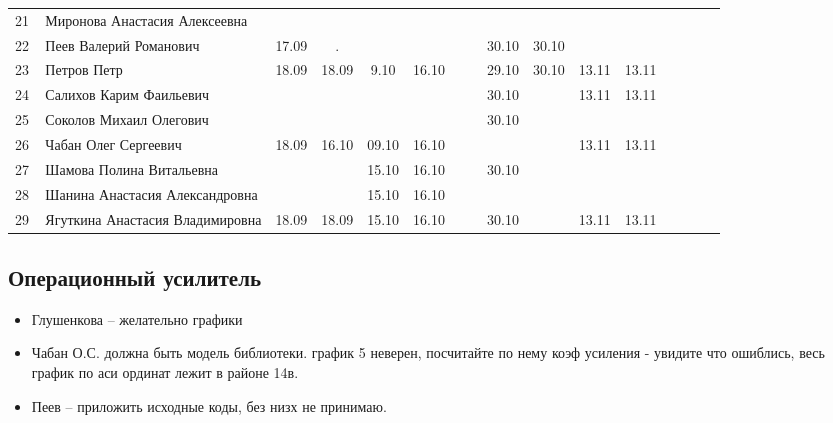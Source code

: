 \begin{tabular}{l|llccccccccccccc}
\midrule
21\,& Миронова Анастасия Алексеевна   \\
22\,& Пеев Валерий Романович          &17.09& .   &     &      &     &      &30.10&30.10\\
23\,& Петров Петр                     &18.09&18.09& 9.10&16.10 &     &      &29.10&30.10&13.11&13.11\\
24\,& Салихов Карим Фаильевич         &     &     &     &      &     &      &30.10&     &13.11&13.11\\
25\,& Соколов Михаил Олегович         &     &     &     &      &     &      &30.10&\\
\midrule
26\,& Чабан Олег Сергеевич            &18.09&16.10&09.10&16.10&      &      &     &     &13.11&13.11\\
27\,& Шамова Полина Витальевна        &    &      &15.10&16.10 &     &      &30.10&\\
28\,& Шанина Анастасия Александровна  &    &      &15.10&16.10 &     &      &\\
29\,& Ягуткина Анастасия Владимировна &18.09&18.09&15.10&16.10 &     &      &30.10&     &13.11&13.11\\
\bottomrule
\end{tabular}


\subsection*{Операционный усилитель}
\begin{itemize}
\item Глушенкова -- желательно графики
\item Чабан О.С. должна быть модель библиотеки. график 5 неверен, посчитайте по нему коэф усиления - увидите что ошиблись, весь график по аси ординат лежит в районе 14в.
\item Пеев  -- приложить исходные коды, без низх не принимаю.
\end{itemize}

